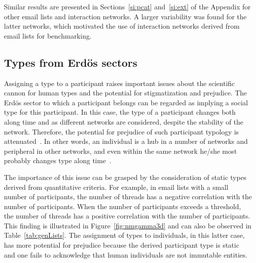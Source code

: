 Similar results are presented in Sections~\ref{si:pcat} and~\ref{si:ext}
of the Appendix for other email lists and interaction networks. A larger variability was found for the latter networks,
which motivated the use of interaction networks derived from email lists for benchmarking.


\subsection{Types from Erd\"os sectors}\label{sec:pty}


Assigning a type to a participant raises important issues about the scientific cannon for human types and the potential for stigmatization and prejudice. The Erd\"os sector to which a participant belongs can be regarded as implying a social type for this participant.
In this case, the type of a participant changes both along time and as different networks are considered, despite the stability of the network. Therefore, the potential for prejudice of such participant typology is attenuated~\cite{adorno}. In other words, an individual is a hub in a number of networks and peripheral in other networks, and even within the same network he/she most probably changes type along time~\cite{animacoes}.

The importance of this issue can be grasped by the consideration of static types derived from quantitative criteria. For example, in email lists with a small number of participants, the number of threads has a negative correlation with the number of participants.
When the number of participants exceeds a threshold, the number of threads has a positive correlation with the number of participants.
This finding is illustrated in Figure~\ref{fig:nmgamma3d}
and can also be observed in Table~\ref{tab:genLists}.
The assignment of types to individuals, in this latter case,
has more potential for prejudice because
the derived participant type is static and
one fails to acknowledge that
human individuals are not immutable entities.

